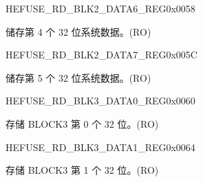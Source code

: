 \begin{register}{H}{EFUSE\_RD\_BLK2\_DATA6\_REG}{0x0058}\label{regdesc:EFUSERDBLK2DATA6REG}
%
\regnewline%
\begin{regdesc}\begin{reglist}
\label{fielddesc:EFUSESYSDATA5}\item [EFUSE\_SYS\_DATA5] 储存第 4 个 32 位系统数据。(RO)
\end{reglist}\end{regdesc}
\end{register}


\begin{register}{H}{EFUSE\_RD\_BLK2\_DATA7\_REG}{0x005C}\label{regdesc:EFUSERDBLK2DATA7REG}
%
\regnewline%
\begin{regdesc}\begin{reglist}
\label{fielddesc:EFUSESYSDATA6}\item [EFUSE\_SYS\_DATA6] 储存第 5 个 32 位系统数据。(RO)
\end{reglist}\end{regdesc}
\end{register}


\begin{register}{H}{EFUSE\_RD\_BLK3\_DATA0\_REG}{0x0060}\label{regdesc:EFUSERDBLK3DATA0REG}
%
\regnewline%
\begin{regdesc}\begin{reglist}
\label{fielddesc:EFUSEBLK3DATA0}\item [EFUSE\_BLK3\_DATA0] 存储 BLOCK3 第 0 个 32 位。(RO)
\end{reglist}\end{regdesc}
\end{register}


\begin{register}{H}{EFUSE\_RD\_BLK3\_DATA1\_REG}{0x0064}\label{regdesc:EFUSERDBLK3DATA1REG}
%
\regnewline%
\begin{regdesc}\begin{reglist}
\label{fielddesc:EFUSEBLK3DATA1}\item [EFUSE\_BLK3\_DATA1] 存储 BLOCK3 第 1 个 32 位。(RO)
\end{reglist}\end{regdesc}
\end{register}


